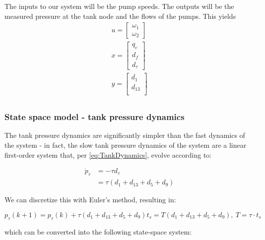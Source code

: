 The inputs to our system will be the pump speeds. 
The outputs will be the measured pressure at the tank node and the flows of the pumps. This yields
\begin{equation}\label{eq:StateSpaceInputsOutputsFast}
	\begin{split}
		u = \begin{bmatrix} \omega_1 \\ \omega_2	\end{bmatrix} \\
		x = \begin{bmatrix} q_c \\ d_f \\ d_{\tau}	\end{bmatrix} \\
		y = \begin{bmatrix} d_1 \\ d_{13} \\ 	\end{bmatrix} \\
	\end{split}
\end{equation}

\subsubsection{State space model - tank pressure dynamics}
The tank pressure dynamics are significantly simpler than the fast dynamics of the system - in fact, the slow tank pressure dynamics of the system are a linear first-order system that, per \cref{eq:TankDynamics}, evolve according to:

\begin{equation}\label{eq:SlowTankDynamics}
	\begin{split}
		\dot{p}_\tau &= - \tau d_\tau \\
		&= \tau \left(d_1 + d_{13} + d_5 + d_9\right)
	\end{split}
\end{equation}

We can discretize this with Euler's method, resulting in:

\begin{equation}\label{eq:TankDynamicsDiscrete}
	p_\tau(k+1) = p_\tau(k) + \tau \left(d_1 + d_{13} + d_5 + d_9\right)t_s = T\left(d_1 + d_{13} + d_5 + d_9\right), \ T = \tau\cdot t_s 
\end{equation}

which can be converted into the following state-space system:


